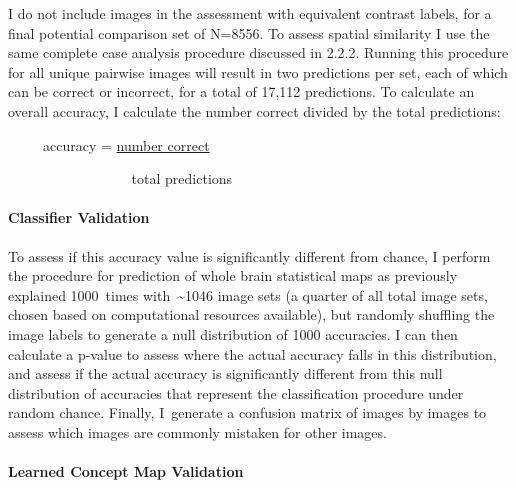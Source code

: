\documentclass{report}
\begin{document}
I do not include images in the assessment with equivalent contrast
labels, for a final potential comparison set of N=8556. To assess
spatial similarity I use the same complete case analysis procedure
discussed in 2.2.2. Running this procedure for all unique pairwise
images will result in two predictions per set, each of which can be
correct or incorrect, for a total of 17,112 predictions. To calculate an
overall accuracy, I calculate the number correct divided by the total
predictions: \newline

~ ~ ~ accuracy = \underline{number correct}

 ~ ~ ~ ~ ~ ~ ~ ~ ~ ~  ~total predictions

\paragraph{Classifier Validation}

To assess if this accuracy value is significantly different from chance,
I perform the procedure for prediction of whole brain statistical maps as previously explained 1000~times
with~\textasciitilde{}1046 image sets (a quarter of all total image
sets, chosen based on computational resources available), but randomly
shuffling the image labels to generate a null distribution of 1000
accuracies. I can then calculate a p-value to assess where the actual accuracy falls in this distribution, and assess if the actual
accuracy is significantly different from this null distribution of
accuracies that represent the classification procedure under random
chance. Finally, I~generate a confusion matrix of images by images to
assess which images are commonly mistaken for other images.

\paragraph{Learned Concept Map Validation}
\end{document}
